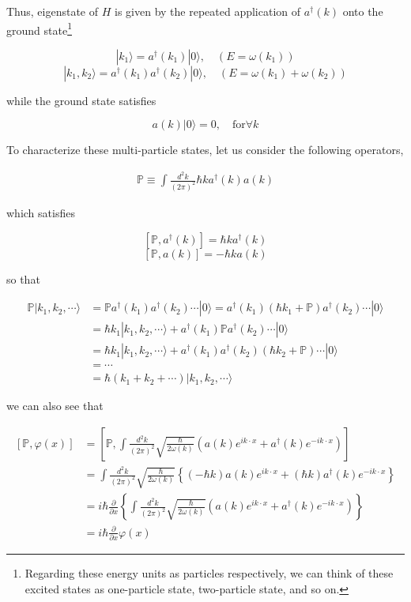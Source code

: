 ﻿\documentclass[twoside]{book}
\numberwithin{equation}{section}
\begin{document}
Thus, eigenstate of $H$ is given by the repeated application of $a^\dagger(k)$ onto the ground state\footnote{Regarding these energy units as particles respectively, we can think of these excited states as one-particle state, two-particle state, and so on. }

\[|k_1\rangle = a^\dagger(k_1)|0\rangle,\quad (E=\omega(k_1)) \]
\[|k_1,k_2\rangle = a^\dagger(k_1)a^\dagger(k_2)|0\rangle,\quad (E=\omega(k_1)+\omega(k_2)) \]

while the ground state satisfies

\[a(k)|0\rangle = 0,\quad\text{for}\forall k \]

To characterize these multi-particle states, let us consider the following operators, 

\begin{align}
\mathbb{P} \equiv\int\frac{d^2 k}{(2\pi)^2}\hbar{k}a^\dagger({k})a({k})
\end{align}

which satisfies

\[[\mathbb{P},a^\dagger({k})] = \hbar {k}a^\dagger(k) \]
\[[\mathbb{P},a(k)] = -\hbar ka(k) \]

so that

\[\begin{split}
\mathbb{P}|k_1,k_2,\cdots\rangle &= \mathbb{P}a^\dagger(k_1)a^\dagger(k_2)\cdots|0\rangle  = a^\dagger(k_1)(\hbar k_1+\mathbb{P})a^\dagger(k_2)\cdots|0\rangle\\
&= \hbar k_1 |k_1,k_2,\cdots\rangle + a^\dagger(k_1)\mathbb{P}a^\dagger(k_2)\cdots|0\rangle\\
&= \hbar k_1|k_1,k_2,\cdots\rangle + a^\dagger(k_1)a^\dagger(k_2)(\hbar k_2+\mathbb{P})\cdots|0\rangle\\
&=\cdots\\
&=\hbar(k_1+k_2+\cdots)|k_1,k_2,\cdots\rangle
\end{split}\]

we can also see that

\[\begin{split}
[\mathbb{P},\varphi(x)] &= \left[\mathbb{P},\int\frac{d^2k}{(2\pi)^2}\sqrt{\frac{\hbar}{2\omega(k)}}\left(a(k)e^{ik\cdot x}+a^\dagger(k)e^{-ik\cdot x}\right)\right]\\
&= \int\frac{d^2 k}{(2\pi)^2}\sqrt{\frac{\hbar}{2\omega(k)}}\left\{(-\hbar k)a(k)e^{ik\cdot x}+(\hbar k)a^\dagger(k)e^{-ik\cdot x}\right\}\\
&= i\hbar\frac{\partial}{\partial x}\left\{\int\frac{d^2 k}{(2\pi)^2}\sqrt{\frac{\hbar}{2\omega(k)}}\left(a(k)e^{ik\cdot x}+a^\dagger(k)e^{-ik\cdot x}\right)\right\}\\
&=i\hbar\frac{\partial}{\partial x}\varphi(x)
\end{split}\]
\end{document}
